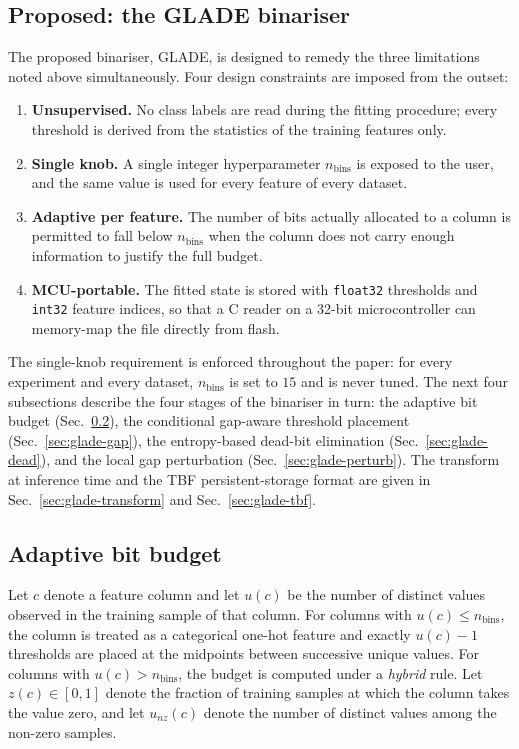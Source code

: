 \documentclass[journal,10pt]{IEEEtran}
\begin{document}
\subsection{Proposed: the GLADE binariser}
\label{sec:glade-intro}
The proposed binariser, GLADE, is designed to remedy the three
limitations noted above simultaneously. Four design constraints are
imposed from the outset:
\begin{enumerate}
  \item \textbf{Unsupervised.} No class labels are read during the
        fitting procedure; every threshold is derived from the
        statistics of the training features only.
  \item \textbf{Single knob.} A single integer hyperparameter
        $n_\text{bins}$ is exposed to the user, and the same value is
        used for every feature of every dataset.
  \item \textbf{Adaptive per feature.} The number of bits actually
        allocated to a column is permitted to fall below $n_\text{bins}$
        when the column does not carry enough information to justify
        the full budget.
  \item \textbf{MCU-portable.} The fitted state is stored with
        \texttt{float32} thresholds and \texttt{int32} feature
        indices, so that a C reader on a 32-bit microcontroller can
        memory-map the file directly from flash.
\end{enumerate}
The single-knob requirement is enforced throughout the paper: for
every experiment and every dataset, $n_\text{bins}$ is set to $15$
and is never tuned. The next four subsections describe the four stages
of the binariser in turn: the adaptive bit budget
(Sec.~\ref{sec:glade-budget}), the conditional gap-aware threshold
placement (Sec.~\ref{sec:glade-gap}), the entropy-based dead-bit
elimination (Sec.~\ref{sec:glade-dead}), and the local gap
perturbation (Sec.~\ref{sec:glade-perturb}). The transform at
inference time and the TBF persistent-storage format are given in
Sec.~\ref{sec:glade-transform} and Sec.~\ref{sec:glade-tbf}.

\subsection{Adaptive bit budget}
\label{sec:glade-budget}
Let $c$ denote a feature column and let $u(c)$ be the number of
distinct values observed in the training sample of that column. For
columns with $u(c) \le n_\text{bins}$, the column is treated as a
categorical one-hot feature and exactly $u(c) - 1$ thresholds are
placed at the midpoints between successive unique values. For
columns with $u(c) > n_\text{bins}$, the budget is computed under a
\emph{hybrid} rule. Let $z(c) \in [0,1]$ denote the fraction of
training samples at which the column takes the value zero, and let
$u_{nz}(c)$ denote the number of distinct values among the non-zero
samples.
\end{document}
